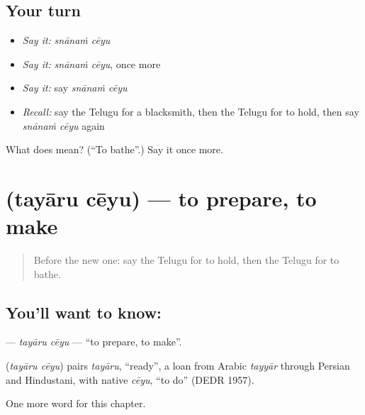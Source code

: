 \subsection*{Your turn}
\begin{itemize}
\raggedright
  \item \emph{Say it:} \emph{snānaṁ cēyu}
  \item \emph{Say it:} \emph{snānaṁ cēyu}, once more
  \item \emph{Say it:} say \emph{snānaṁ cēyu}
  \item \emph{Recall:} say the Telugu for a blacksmith, then the Telugu for to hold, then say \emph{snānaṁ cēyu} again
\end{itemize}

\begin{tcolorbox}[breakable,colback=teal!4,colframe=teal!35!black,title={Before you move on}]
What does   mean? (\textquotedblleft{}To bathe\textquotedblright{}.) Say it once more.
\end{tcolorbox}
\section[\texorpdfstring{\te{తయారు} \te{చేయు} (tayāru cēyu)}{తయారు చేయు (tayāru cēyu)}]{  (tayāru cēyu) — to prepare, to make}

\label{lesson:TE-C278-tayaru-ceyu}



\begin{quote}
Before the new one: say the Telugu for to hold, then the Telugu for to bathe.
\end{quote}

\subsection*{You'll want to know:  }
\textbf{ } — \emph{tayāru cēyu} — \textquotedblleft{}to prepare, to make\textquotedblright{}.

\begin{cousinweb}
\textbf{ } (\emph{tayāru cēyu}) pairs \emph{tayāru}, \textquotedblleft{}ready\textquotedblright{}, a loan from Arabic \emph{tayyār} through Persian and Hindustani, with native \emph{cēyu}, \textquotedblleft{}to do\textquotedblright{} (DEDR 1957).
\end{cousinweb}

\begin{grammarlens}[title={What you've built}]
One more word for this chapter.
\end{grammarlens}

